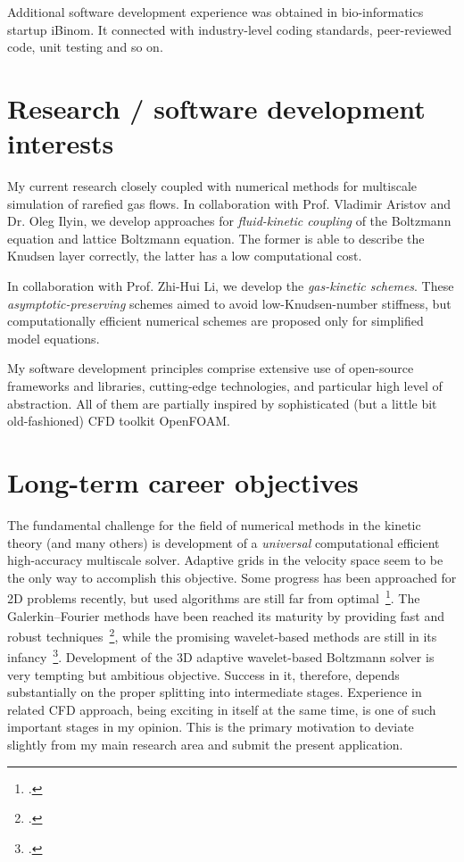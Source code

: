\documentclass[11pt]{article}
\renewcommand\cite\footcite
\begin{document}
Additional software development experience was obtained in bio-informatics startup iBinom.
It connected with industry-level coding standards, peer-reviewed code, unit testing and so on.

\section{Research / software development interests}

My current research closely coupled with numerical methods for multiscale simulation of rarefied gas flows.
In collaboration with Prof. Vladimir Aristov and Dr. Oleg Ilyin\footnotemark, we develop approaches
for \emph{fluid-kinetic coupling} of the Boltzmann equation and lattice Boltzmann equation.
The former is able to describe the Knudsen layer correctly, the latter has a low computational cost.

In collaboration with Prof. Zhi-Hui Li\footnotemark, we develop the \emph{gas-kinetic schemes}.
These \emph{asymptotic-preserving} schemes aimed to avoid low-Knudsen-number stiffness,
but computationally efficient numerical schemes are proposed only for simplified model equations.

My software development principles comprise extensive use of open-source frameworks and libraries,
cutting-edge technologies, and particular high level of abstraction.
All of them are partially inspired by sophisticated (but a little bit old-fashioned) CFD toolkit OpenFOAM.

\section{Long-term career objectives}

The fundamental challenge for the field of numerical methods in the kinetic theory (and many others) is
development of a \emph{universal} computational efficient high-accuracy multiscale solver.
Adaptive grids in the velocity space seem to be the only way to accomplish this objective.
Some progress has been approached for 2D problems recently,
but used algorithms are still far from optimal~\cite{Kolobov2013}.
The Galerkin--Fourier methods have been reached its maturity by providing fast and robust techniques~\cite{Pareschi2006, Reese2013},
while the promising wavelet-based methods are still in its infancy~\cite{Lemou2003, Tran2013}.
Development of the 3D adaptive wavelet-based Boltzmann solver is very tempting but ambitious objective.
Success in it, therefore, depends substantially on the proper splitting into intermediate stages.
Experience in related CFD approach, being exciting in itself at the same time, is one of such important stages in my opinion.
This is the primary motivation to deviate slightly from my main research area and submit the present application.
\end{document}

